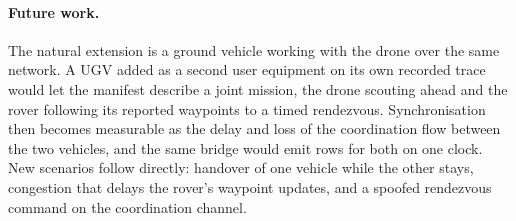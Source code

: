 \documentclass[10pt,twocolumn]{article}
\begin{document}
\paragraph{Future work.} The natural extension is a ground vehicle working
with the drone over the same network. A UGV added as a second user equipment
on its own recorded trace would let the manifest describe a joint mission,
the drone scouting ahead and the rover following its reported waypoints to
a timed rendezvous. Synchronisation then
becomes measurable as the delay and loss of the coordination flow between
the two vehicles, and the same bridge would emit rows for both on one clock.
New scenarios follow directly: handover of one vehicle while the other
stays, congestion that delays the rover's waypoint updates, and a spoofed
rendezvous command on the coordination channel.
\end{document}
